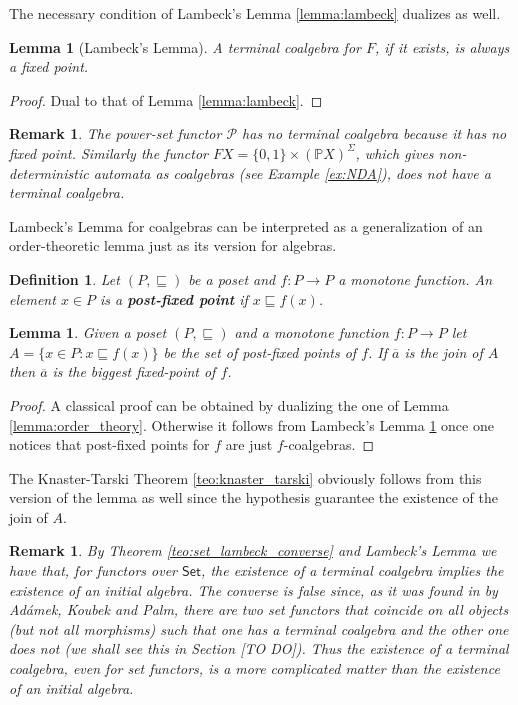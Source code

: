 \documentclass[letterpaper, 11pt, oneside]{memoir}
\theoremstyle{myteo}
\newtheorem{lemma}[theorem]{Lemma}
\newtheorem{definition}[theorem]{Definition}
\newtheorem{remark}[theorem]{Remark}
\numberwithin{equation}{section}
\newcommand{\Set}{\textsf{Set}}
\begin{document}
The necessary condition of Lambeck's Lemma \ref{lemma:lambeck} dualizes as well.

\begin{lemma}[Lambeck's Lemma]
  \label{lemma:colambeck}
  A terminal coalgebra for \(F\), if it exists, is always a fixed point.
\end{lemma}

\begin{proof}
  Dual to that of Lemma \ref{lemma:lambeck}.
\end{proof}

\begin{remark}
  The power-set functor \(\mathcal{P}\) has no terminal coalgebra because it has no fixed point.
  Similarly the functor \(FX = \{0, 1\} \times (\mathbb{P}X)^\Sigma\), which gives non-deterministic automata as coalgebras (see Example \ref{ex:NDA}), does not have a terminal coalgebra.
\end{remark}

Lambeck's Lemma for coalgebras can be interpreted as a generalization of an order-theoretic lemma just as its version for algebras.

\begin{definition}
  Let \((P, \sqsubseteq)\) be a poset and \(f: P \to P\) a monotone function.
  An element \(x \in P\) is a \textbf{post-fixed point} if \(x \sqsubseteq f(x)\).
\end{definition}

\begin{lemma}
  Given a poset \((P, \sqsubseteq)\) and a monotone function \(f: P \to P\) let \(A = \{x \in P : x \sqsubseteq f(x)\}\) be the set of post-fixed points of \(f\).
  If \(\overline{a}\) is the join of \(A\) then \(\overline{a}\) is the biggest fixed-point of \(f\).
\end{lemma}

\begin{proof}
  A classical proof can be obtained by dualizing the one of Lemma \ref{lemma:order_theory}.
  Otherwise it follows from Lambeck's Lemma \ref{lemma:colambeck} once one notices that post-fixed points for \(f\) are just \(f\)-coalgebras.
\end{proof}

The Knaster-Tarski Theorem \ref{teo:knaster_tarski} obviously follows from this version of the lemma as well since the hypothesis guarantee the existence of the join of \(A\).

\begin{remark}
  By Theorem \ref{teo:set_lambeck_converse} and Lambeck's Lemma we have that, for functors over \(\Set\), the existence of a terminal coalgebra implies the existence of an initial algebra.
  The converse is false since, as it was found in \cite[Example 3.14]{Adamek-2016} by Adámek, Koubek and Palm, there are two set functors that coincide on all objects (but not all morphisms) such that one has a terminal coalgebra and the other one does not (we shall see this in Section [TO DO]).
  Thus the existence of a terminal coalgebra, even for set functors, is a more complicated matter than the existence of an initial algebra.
\end{remark}
\end{document}
